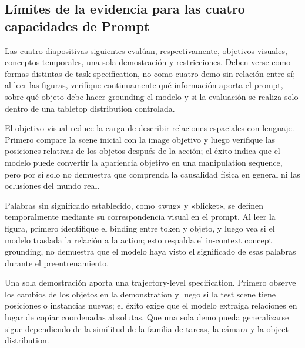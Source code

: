 \subsection{Límites de la evidencia para las cuatro capacidades de Prompt}

Las cuatro diapositivas siguientes evalúan, respectivamente, objetivos visuales, conceptos temporales, una sola demostración y restricciones. Deben verse como formas distintas de task specification, no como cuatro demo sin relación entre sí; al leer las figuras, verifique continuamente qué información aporta el prompt, sobre qué objeto debe hacer grounding el modelo y si la evaluación se realiza solo dentro de una tabletop distribution controlada.


El objetivo visual reduce la carga de describir relaciones espaciales con lenguaje. Primero compare la scene inicial con la image objetivo y luego verifique las posiciones relativas de los objetos después de la acción; el éxito indica que el modelo puede convertir la apariencia objetivo en una manipulation sequence, pero por sí solo no demuestra que comprenda la causalidad física en general ni las oclusiones del mundo real.


Palabras sin significado establecido, como «wug» y «blicket», se definen temporalmente mediante su correspondencia visual en el prompt. Al leer la figura, primero identifique el binding entre token y objeto, y luego vea si el modelo traslada la relación a la action; esto respalda el in-context concept grounding, no demuestra que el modelo haya visto el significado de esas palabras durante el preentrenamiento.


Una sola demostración aporta una trajectory-level specification. Primero observe los cambios de los objetos en la demonstration y luego si la test scene tiene posiciones o instancias nuevas; el éxito exige que el modelo extraiga relaciones en lugar de copiar coordenadas absolutas. Que una sola demo pueda generalizarse sigue dependiendo de la similitud de la familia de tareas, la cámara y la object distribution.

